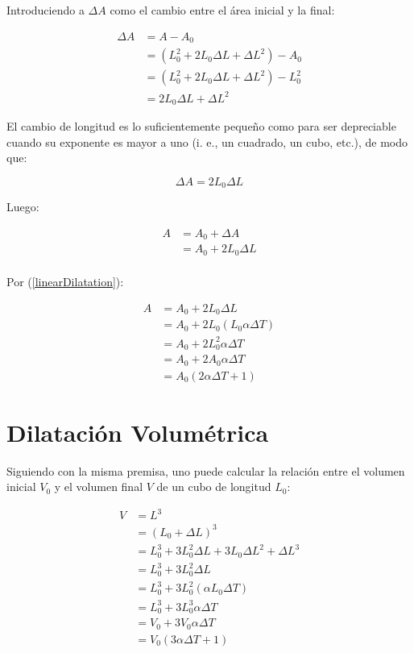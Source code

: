 \documentclass{article}
\begin{document}
Introduciendo a \(\Delta A\) como el cambio entre el
área inicial y la final:

\begin{align*}
    \Delta A    &= A - A_0 \\
                &= \left( L_0^2 + 2 L_0 \Delta L + \Delta L^2 \right) - A_0 \\
                &= \left( L_0^2 + 2 L_0 \Delta L + \Delta L^2 \right) - L_0^2 \\
                &= 2 L_0 \Delta L + \Delta L^2
\end{align*}

El cambio de longitud
es lo suficientemente pequeño como para ser
depreciable cuando su exponente es mayor a uno
(i. e., un cuadrado, un cubo, etc.), de modo que:

\[
    \Delta A = 2 L_0 \Delta L
\]

Luego:

\begin{align*}
    A   &= A_0 + \Delta A \\
        &= A_0 + 2 L_0 \Delta L \\
\end{align*}

Por (\ref{linearDilatation}):

\begin{align*}
    A   &= A_0 + 2 L_0 \Delta L \\
        &= A_0 + 2 L_0 \left( L_0 \alpha \Delta T \right) \\
        &= A_0 + 2 L_0^2 \alpha \Delta T \\
        &= A_0 + 2 A_0 \alpha \Delta T \\
        &= A_0 \left( 2 \alpha \Delta T + 1 \right)
\end{align*}

\section*{Dilatación Volumétrica}

Siguiendo con la misma premisa, uno puede calcular 
la relación entre el volumen inicial \(V_0\) y el
volumen final \(V\) de 
un cubo de longitud \(L_0\):

\begin{align*}
    V   &= L^3 \\
        &= \left( L_0 + \Delta L \right)^3 \\
        &= L_0^3 + 3 L_0^2 \Delta L + 3 L_0 \Delta L^2 + \Delta L^3 \\
        &= L_0^3 + 3 L_0^2 \Delta L \\
        &= L_0^3 + 3 L_0^2 \left( \alpha L_0 \Delta T \right) \\
        &= L_0^3 + 3 L_0^3 \alpha \Delta T \\
        &= V_0 + 3 V_0 \alpha \Delta T \\
        &= V_0 \left( 3 \alpha \Delta T + 1 \right) 
\end{align*}
\end{document}
